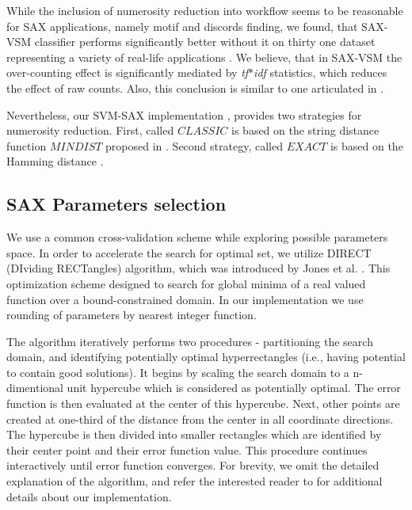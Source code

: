\documentclass{llncs}
\begin{document}
While the inclusion of numerosity reduction into workflow seems to be reasonable for SAX
applications, namely motif and discords finding, we found, that SAX-VSM classifier performs
significantly better without it on thirty one dataset representing a variety of real-life
applications \cite{jmotif}.
We believe, that in SAX-VSM the over-counting effect is significantly mediated by
\textit{tf$\ast$idf} statistics, which reduces the effect of raw counts. Also, this conclusion is
similar to one articulated in \cite{bag_patterns}.

Nevertheless, our SVM-SAX implementation \cite{jmotif}, provides two strategies for numerosity
reduction. First, called $CLASSIC$ is based on the string distance function $MINDIST$ proposed
in \cite{streaming_sax}. Second strategy, called $EXACT$ is based on the Hamming distance
\cite{hamming}. 

\subsection{SAX Parameters selection} \label{section-direct}
We use a common cross-validation scheme while exploring possible parameters space. 
In order to accelerate the search for optimal set, 
we utilize DIRECT (DIviding RECTangles) algorithm, which 
was introduced by Jones et al. \cite{direct-original}. This optimization scheme 
designed to search for global minima of a real valued function over a bound-constrained domain. 
In our implementation we use rounding of parameters by nearest integer function.

The algorithm iteratively performs two procedures - partitioning the search domain, 
and identifying potentially optimal hyperrectangles (i.e., having potential to contain good
solutions). 
It begins by scaling the search domain to a n-dimentional unit hypercube which is considered 
as potentially optimal. The error function is then evaluated at the center of this hypercube. Next, 
other points are created at one-third of the distance from the center in all coordinate directions. 
The hypercube is then divided into smaller rectangles which are identified by their center point 
and their error function value. This procedure continues interactively until error function
converges.
For brevity, we omit the detailed explanation of the algorithm, and refer the 
interested reader to \cite{direct} for additional details about our implementation.
\end{document}
